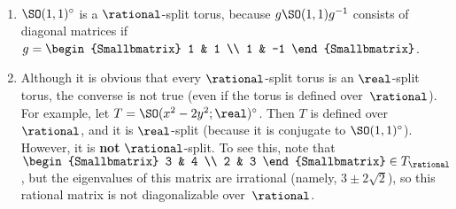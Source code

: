 \begin{eg} \ 
\noprelistbreak
 \begin{enumerate}
 \item $\SO(1,1)^\circ$ is a $\rational$-split torus, because $g \SO(1,1) g^{-1}$ consists of diagonal matrices if $g =  \begin{Smallbmatrix}
 1 & 1 \\
 1 & -1 
 \end{Smallbmatrix}
 $.
 
\item Although it is obvious that every $\rational$-split torus is an $\real$-split torus, the converse is not true (even if the torus is defined over~$\rational$). For example, let $T = \SO(x^2 - 2y^2; \real)^\circ$. Then $T$ is defined over~$\rational$, and it is $\real$-split (because it is conjugate to $\SO(1,1)^\circ$). However, it is \textbf{not} $\rational$-split. To see this, note that 
 $ \begin{Smallbmatrix}
 3 & 4 \\
 2 & 3 
 \end{Smallbmatrix}
 \in T_{\rational}
 $,
 but the eigenvalues of this matrix are irrational (namely,
$3 \pm 2\sqrt{2}$), so this rational matrix is not
diagonalizable over~$\rational$. 

 \end{enumerate}
\end{eg}

